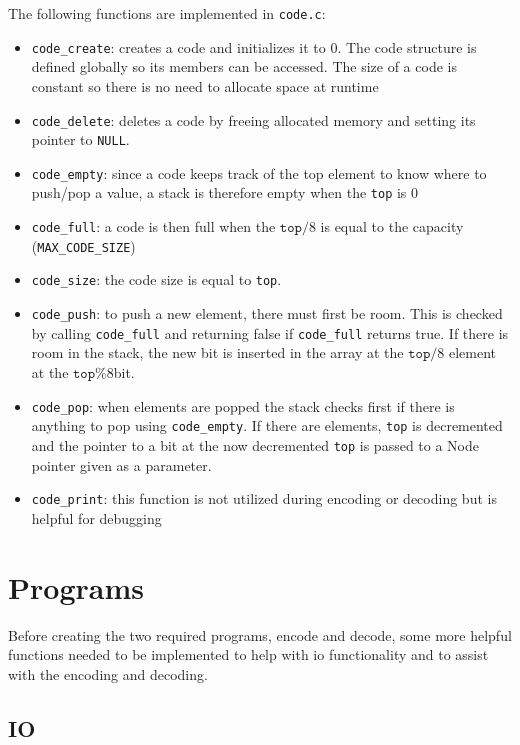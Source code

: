 \documentclass[12pt]{article}
\def\code#1{\texttt{#1}} %
\begin{document}
The following functions are implemented in \code{code.c}:

\begin{itemize}
	\item{\code{code\_create}: creates a code and initializes it to 0.
			The code structure is defined globally so its members can be accessed. The size
		of a code is constant so there is no need to allocate space at runtime}
	\item{\code{code\_delete}: deletes a code by freeing allocated memory and setting its 
		pointer to \code{NULL}.}
	\item{\code{code\_empty}: since a code keeps track of the top element to know where to push/pop
		a value, a stack is therefore empty when the \code{top} is 0}
	\item{\code{code\_full}: a code is then full when the $\code{top} / 8$ is equal to the
		capacity (\code{MAX\_CODE\_SIZE})}
	\item{\code{code\_size}: the code size is equal to \code{top}.}
	\item{\code{code\_push}: to push a new element, there must first be room. This is checked
			by calling \code{code\_full} and returning false if \code{code\_full} returns true.
			If there is room in the stack, the new bit is inserted in the array at the $\code{top} / 8$ element
		at the $\code{top} \% 8$bit.}
	\item{\code{code\_pop}: when elements are popped the stack checks first if there is
			anything to pop using \code{code\_empty}. If there are elements, \code{top} is
			decremented and the pointer to a bit at the now decremented \code{top} is passed
		to a Node pointer given as a parameter.} 
	\item{\code{code\_print}: this function is not utilized during encoding or decoding
		but is helpful for debugging}
\end{itemize}

\section{Programs}

Before creating the two required programs, encode and decode, some more helpful
functions needed to be implemented to help with io functionality and to assist
with the encoding and decoding.

\subsection{IO}
\end{document}
